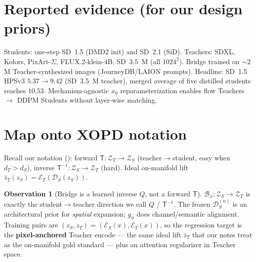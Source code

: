 \documentclass[11pt,a4paper]{article}
\newcommand{\Za}{\mathcal{Z}_{T}}
\newcommand{\Zb}{\mathcal{Z}_{S}}
\newcommand{\Enc}{\mathcal{E}}
\newcommand{\Dec}{\mathcal{D}}
\newcommand{\Bridge}{\mathcal{B}}
\newcommand{\Tmap}{\mathsf{T}}
\newcommand{\Tinv}{\mathsf{T}^{-1}}
\theoremstyle{definition}
\newtheorem{observation}{Observation}
\begin{document}
\section{Reported evidence (for our design priors)}
\label{sec:evidence}

Students: one-step SD~1.5 (DMD2 init) and SD~2.1 (SiD). Teachers: SDXL, Kolors,
PixArt-$\Sigma$, FLUX.2-klein-4B, SD~3.5~M (all $1024^2$). Bridge trained on ${\sim}2$M
Teacher-synthesized images (JourneyDB/LAION prompts). Headline: SD~1.5 HPSv3
$5.37\to 9.42$ (SD~3.5~M teacher), merged average of five distilled students reaches
$10.53$. Mechanism-agnostic $x_0$ reparameterization enables flow Teachers $\to$ DDPM
Students without layer-wise matching.

\section{Map onto XOPD notation}
\label{sec:map}

Recall our notation ():
forward $\Tmap:\Za\to\Zb$ (teacher$\to$student, easy when $d_T>d_S$),
inverse $\Tinv:\Zb\to\Za$ (hard). Ideal on-manifold lift
$\bar z_T(z_S)=\Enc_T(\Dec_S(z_S))$.

\begin{observation}[Bridge is a learned inverse $Q$, not a forward $\Tmap$]
\label{obs:bridge-is-Q}
$\Bridge_\phi:\Zb\to\Za$ is exactly the student$\to$teacher direction we call $Q$ /
$\Tinv$. The frozen $\Dec_S^{(n)}$ is an architectural prior for \emph{spatial}
expansion; $g_\phi$ does channel/semantic alignment. Training pairs are
$(z_S,z_T)=(\Enc_S(x),\Enc_T(x))$, so the regression target is the
\textbf{pixel-anchored} Teacher encode --- the same ideal lift
$\bar z_T$ that our notes treat as the on-manifold gold standard --- plus an
attention regularizer in Teacher space.
\end{observation}
\end{document}

